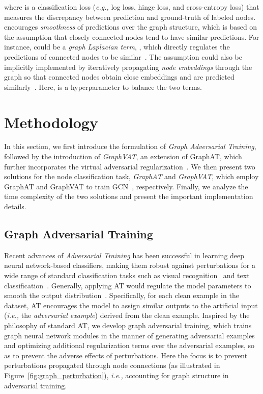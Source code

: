 \documentclass[10pt,journal,compsoc]{IEEEtran}
\newcommand{\ie}{\emph{i.e., }}
\newcommand{\eg}{\emph{e.g., }}
\begin{document}
where  is a classification loss (\eg log loss, hinge loss, and cross-entropy loss) that measures the discrepancy between prediction and ground-truth of labeled nodes.  encourages \textit{smoothness} of predictions over the graph structure, which is based on the assumption that closely connected nodes tend to have similar predictions. For instance,  could be a \textit{graph Laplacian term}, , which directly regulates the predictions of connected nodes to be similar~\cite{zhu2003semi,zhou2004learning,belkin2006manifold,talukdar2009new}. The assumption could also be implicitly implemented by iteratively propagating \textit{node embeddings} through the graph so that connected nodes obtain close embeddings and are predicted similarly~\cite{hamilton2017inductive,kipf2017semi,ni2018co,velickovic2018graph}. Here,  is a hyperparameter to balance the two terms.

%
 \section{Methodology}
In this section, we first introduce the formulation of \textit{Graph Adversarial Training}, followed by the introduction of \textit{GraphVAT}, an extension of GraphAT, which further incorporates the virtual adversarial regularization~\cite{miyato2018virtual}. We then present two solutions for the node classification task, \textit{GraphAT} and \textit{GraphVAT}, which employ GraphAT and GraphVAT to train GCN~\cite{kipf2017semi}, respectively. Finally, we analyze the time complexity of the two solutions and present the important implementation details.



\subsection{Graph Adversarial Training}
Recent advances of \textit{Adversarial Training} has been successful in learning deep neural network-based classifiers, making them robust against perturbations for a wide range of standard classification tasks such as visual recognition~\cite{goodfellow2015explaining,kurakin2016adversarial,miyato2018virtual} and text classification~\cite{miyato2016adversarial}. Generally, applying AT would regulate the model parameters to smooth the output distribution~\cite{miyato2018virtual}. Specifically, for each clean example in the dataset, AT encourages the model to assign similar outputs to the artificial input (\ie the \textit{adversarial example}) derived from the clean example. Inspired by the philosophy of standard AT, we develop graph adversarial training, which trains graph neural network modules in the manner of generating adversarial examples and optimizing additional regularization terms over the adversarial examples, so as to prevent the adverse effects of perturbations. Here the focus is to prevent perturbations propagated through node connections (as illustrated in Figure~\ref{fig:graph_perturbation}), \ie accounting for graph structure in adversarial training.
\end{document}
